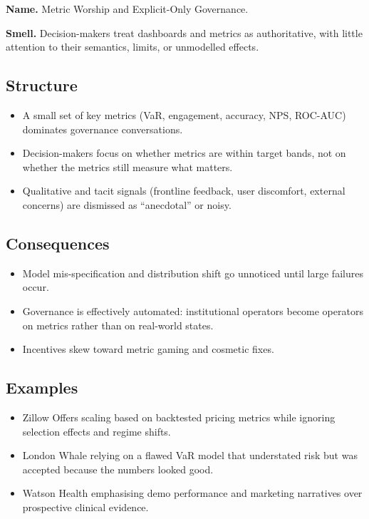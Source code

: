 \textbf{Name.} Metric Worship and Explicit-Only Governance.

\textbf{Smell.} Decision-makers treat dashboards and metrics as
authoritative, with little attention to their semantics, limits, or
unmodelled effects.

\subsection*{Structure}

\begin{itemize}
  \item A small set of key metrics (VaR, engagement, accuracy, NPS,
        ROC-AUC) dominates governance conversations.
  \item Decision-makers focus on whether metrics are within target
        bands, not on whether the metrics still measure what matters.
  \item Qualitative and tacit signals (frontline feedback, user
        discomfort, external concerns) are dismissed as ``anecdotal''
        or noisy.
\end{itemize}

\subsection*{Consequences}

\begin{itemize}
  \item Model mis-specification and distribution shift go unnoticed
        until large failures occur.
  \item Governance is effectively automated: institutional operators
        become operators on metrics rather than on real-world states.
  \item Incentives skew toward metric gaming and cosmetic fixes.
\end{itemize}

\subsection*{Examples}

\begin{itemize}
  \item Zillow Offers scaling based on backtested pricing metrics while
        ignoring selection effects and regime shifts.
  \item London Whale relying on a flawed VaR model that understated
        risk but was accepted because the numbers looked good.
  \item Watson Health emphasising demo performance and marketing
        narratives over prospective clinical evidence.
\end{itemize}

